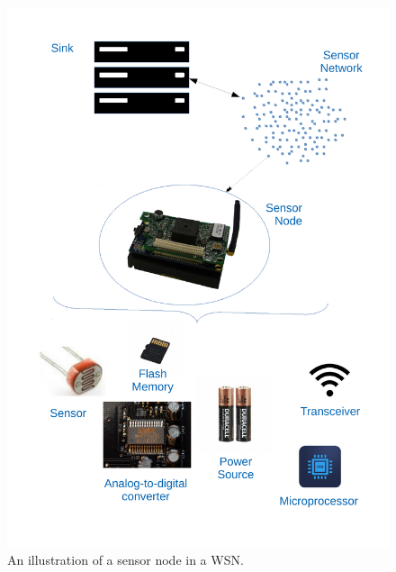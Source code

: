 \begin{figure}[h]
\includegraphics[width=\linewidth, height=0.9\textheight]{images/sensor-network-sensor-node.pdf}
\caption{An illustration of a sensor node in a \ac{WSN}.}
\label{fig:sensor-network}
\centering
\end{figure}

\FloatBarrier

